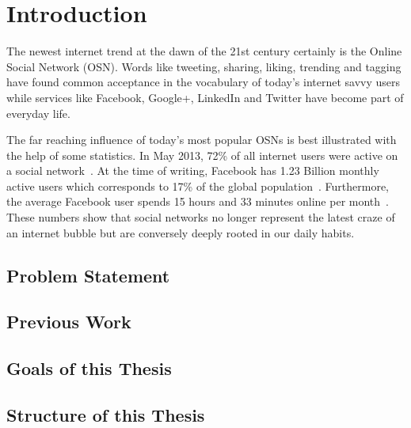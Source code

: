 \chapter{Introduction}
\label{cha:intro}
The newest internet trend at the dawn of the 21st century certainly is the Online Social Network (OSN). Words like tweeting, sharing, liking, trending and tagging have found common acceptance in the vocabulary of today's internet savvy users while services like Facebook, Google+, LinkedIn and Twitter have become part of everyday life. 

The far reaching influence of today's most popular OSNs is best illustrated with the help of some statistics. In May 2013, 72\% of all internet users were active on a social network~\cite{site:Jones13}. At the time of writing, Facebook has 1.23 Billion monthly active users which corresponds to 17\% of the global population~\cite{site:Bullas14,site:worldometers}. Furthermore, the average Facebook user spends 15 hours and 33 minutes online per month~\cite{site:StatisticBrain}. These numbers show that social networks no longer represent the latest craze of an internet bubble but are conversely deeply rooted in our daily habits.



\section{Problem Statement}
\lipsum[6-7]

\section{Previous Work}
\lipsum[6-7]

\section{Goals of this Thesis}
\lipsum[4-5]

\section{Structure of this Thesis}
\lipsum[6-7]

